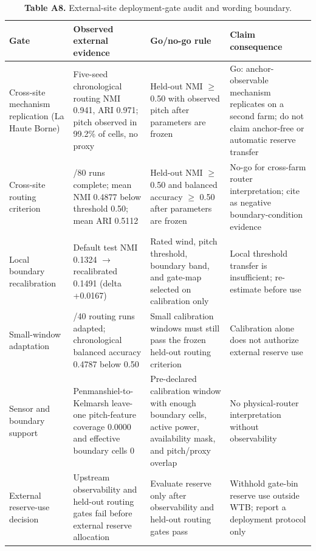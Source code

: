 \begin{table}[H]
\centering
\scriptsize
\setlength{\tabcolsep}{2.2pt}
\renewcommand{\arraystretch}{1.08}
\caption*{\textbf{Table A8.} External-site deployment-gate audit and wording boundary.}
\begin{tabularx}{\columnwidth}{>{\raggedright\arraybackslash}p{} >{\raggedright\arraybackslash}p{} >{\raggedright\arraybackslash}p{} >{\raggedright\arraybackslash}X}
\toprule
Gate & Observed external evidence & Go/no-go rule & Claim consequence \\
\midrule
Cross-site mechanism replication (La Haute Borne) & Five-seed chronological routing NMI 0.941, ARI 0.971; pitch observed in 99.2\% of cells, no proxy & Held-out NMI $\geq$ 0.50 with observed pitch after parameters are frozen & Go: anchor-observable mechanism replicates on a second farm; do not claim anchor-free or automatic reserve transfer \\
Cross-site routing criterion & 80/80 runs complete; mean NMI 0.4877 below threshold 0.50; mean ARI 0.5112 & Held-out NMI $\geq$ 0.50 and balanced accuracy $\geq$ 0.50 after parameters are frozen & No-go for cross-farm router interpretation; cite as negative boundary-condition evidence \\
Local boundary recalibration & Default test NMI 0.1324 $\rightarrow$ recalibrated 0.1491 (delta +0.0167) & Rated wind, pitch threshold, boundary band, and gate-map selected on calibration only & Local threshold transfer is insufficient; re-estimate before use \\
Small-window adaptation & 40/40 routing runs adapted; chronological balanced accuracy 0.4787 below 0.50 & Small calibration windows must still pass the frozen held-out routing criterion & Calibration alone does not authorize external reserve use \\
Sensor and boundary support & Penmanshiel-to-Kelmarsh leave-one pitch-feature coverage 0.0000 and effective boundary cells 0 & Pre-declared calibration window with enough boundary cells, active power, availability mask, and pitch/proxy overlap & No physical-router interpretation without observability \\
External reserve-use decision & Upstream observability and held-out routing gates fail before external reserve allocation & Evaluate reserve only after observability and held-out routing gates pass & Withhold gate-bin reserve use outside WTB; report a deployment protocol only \\
\bottomrule
\end{tabularx}
\end{table}
